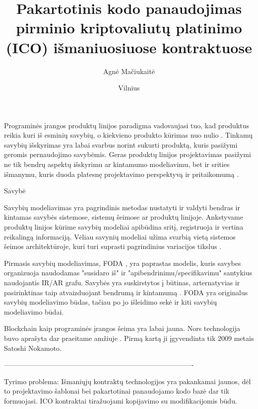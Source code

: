 \documentclass{VUMIFInfKursinis}
\title{Pakartotinis kodo panaudojimas pirminio kriptovaliutų platinimo (ICO) išmaniuosiuose kontraktuose}
\author{Agnė Mačiukaitė}
\date{Vilnius \\ \the\year}
\begin{document}
\maketitle

\tableofcontents

%
Programinės įrangos produktų linijos paradigma vadovaujasi tuo, kad produktus reikia kuri iš esminių savybių, o kiekvieno produkto kūrimas nuo nulio \cite{Lee2015}. Tinkamų savybių išskyrimas yra labai svarbus norint sukurti produktą, kuris pasižymi geromis pernaudojimo savybėmis. Geras produktų linijos projektavimas pasižymi ne tik bendrų aspektų išskyrimu ar kintamumo modeliavimu, bet ir srities išmanymu, kuris duoda platesnę projektavimo perspektyvą ir pritaikomumą \cite{Lee2015}.

Savybė

Savybių modeliavimas yra pagrindinis metodas nustatyti ir valdyti bendras ir kintamas savybės sistemose, sistemų šeimose ar produktų linijoje. Ankstyvame produktų linijos kūrime savybių modeliai apibūdina sritį, registruoja ir vertina  reikalingą informaciją. Vėliau savynių modeliai užima svarbią vietą sistemos šeimos architektūroje, kuri turi suprasti pagrindinius variacijos tikslus \cite{ĮRAŠYTI}.




Pirmasis savybių modeliavimas, FODA \cite{ĮRAŠYTI ŠALTINĮ}, yra paprastas modelis, kuris savybes organizuoja naudodamas "susidaro iš" ir "apibendrinimu/specifikavimu" santykius naudojantis IR/AR grafu. Savybės yra suskirstytos į būtinas, arternatyvias ir pasirinktinas taip atvaizduojant bendrumą ir kintamumą \cite{Kang2013}. FODA yra originalus savybių modeliavimo būdas, tačiau po jo išleidimo sekė ir kiti savybių modeliavimo būdai. 
 
Blockchain kaip programinės įrangos šeima yra labai jauna. Nors technologija buvo aprašyta dar praeitame amžiuje \cite{ĮRAŠYTI ŠALTINius}. Pirmą kartą ji įgyvendinta tik 2009 metais Satoshi Nokamoto. 

----------------------------------------------------------------------------------

Tyrimo problema: Išmaniųjų kontraktų technologijos yra pakankamai jaunos, dėl to projektavimo šablonai bei pakartotinai panaudojamo kodo bazė dar tik formuojasi. ICO kontraktai tiražuojami kopijavimo su modifikacijomis būdu.
\end{document}
